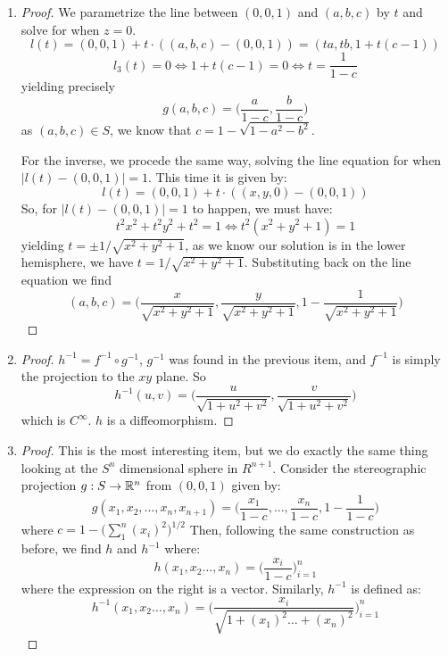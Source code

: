 \begin{problem}
\end{problem}
\begin{enumerate}[label=(\alph*)]
	\item \begin{proof}
		      We parametrize the line between $(0,0,1)$ and $(a,b,c)$ by $t$ and solve for when $z = 0$.
		      $$l(t) = (0,0,1) + t \cdot ((a,b,c) - (0,0,1)) = (ta, tb, 1 + t(c-1))$$
		      $$l_3(t) = 0 \iff 1 + t(c-1) = 0 \iff t = \frac{1}{1-c}$$
		      yielding precisely
		      $$g(a,b,c) = \bigg( \frac{a}{1-c}, \frac{b}{1-c} \bigg)$$
		      as $(a,b,c) \in S$, we know that $c = 1 - \sqrt{1 - a^2 - b^2}$.

		      For the inverse, we procede the same way, solving the line equation for when $|l(t) - (0,0,1)| = 1$.
		      This time it is given by:
		      $$l(t) = (0,0,1) + t\cdot ((x,y,0) - (0,0,1))$$
		      So, for $|l(t) - (0,0,1)| = 1$ to happen, we must have:
		      $$t^2x^2 +t^2y^2 +t^2 = 1 \iff t^2(x^2 + y^2 + 1) = 1$$
		      yielding $t = \pm 1/\sqrt{x^2 + y^2  +1}$, as we know our solution is in the lower hemisphere, we have
		      $t = 1/\sqrt{x^2 + y^2  +1}$. Substituting back on the line equation we find
		      $$(a,b,c) = \bigg(\frac{x}{\sqrt{x^2 + y^2 + 1}}, \frac{y}{\sqrt{x^2 + y^2 + 1}}, 1 - \frac{1}{\sqrt{x^2 + y^2 + 1}}\bigg)$$
	      \end{proof}
	\item \begin{proof}
		      $h^{-1} = f^{-1} \circ g^{-1}$, $g^{-1}$ was found in the previous item, and $f^{-1}$ is simply the projection
		      to the $xy$ plane. So
		      $$h^{-1}(u,v) = \bigg(\frac{u}{\sqrt{1 + u^2 + v^2}}, \frac{v}{\sqrt{1 + u^2 + v^2}} \bigg)$$
		      which is $C^\infty$. $h$ is a diffeomorphism.
	      \end{proof}

	\item \begin{proof}
		      This is the most interesting item, but we do exactly the same thing looking at the $S^n$ dimensional sphere in $R^{n+1}$.
		      Consider the stereographic projection $g: S \rightarrow \mathbb{R}^n$ from $(0,0,1)$ given by:
		      $$g(x_1, x_2, \dots, x_n, x_{n+1}) = \bigg(\frac{x_1}{1 - c}, \dots, \frac{x_{n}}{1-c}, 1 - \frac{1}{1 - c}\bigg)$$
		      where $c = 1 - \bigg(\sum_{1}^{n} (x_i)^2\bigg)^{1/2}$
		      Then, following the same construction as before, we find $h$ and $h^{-1}$ where:
		      $$h(x_1,x_2 \dots, x_n) = \bigg(\frac{x_i}{1 - c} \bigg)_{i=1}^{n}$$
		      where the expression on the right is a vector. Similarly, $h^{-1}$ is defined as:
		      $$h^{-1}(x_1,x_2 \dots, x_n) = \Bigg(\frac{x_i}{\sqrt{1 + (x_1)^2 \dots + (x_n)^2}} \Bigg)_{i=1}^{n}$$
	      \end{proof}
\end{enumerate}


